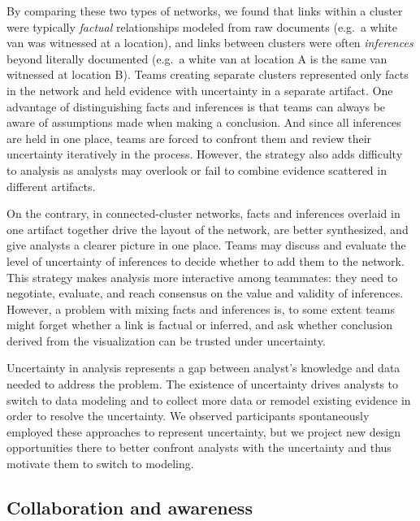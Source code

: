 By comparing these two types of networks, we found that links within a cluster were typically
\emph{factual} relationships modeled from raw documents (e.g.~a white van was
witnessed at a location), and links between clusters were often
\emph{inferences} beyond literally documented (e.g.~a white van at location A
is the same van witnessed at location B). Teams creating separate
clusters represented only facts in the network and held evidence with
uncertainty in a separate artifact. One advantage of distinguishing
facts and inferences is that teams can always be aware of assumptions made when
making a conclusion. And since all inferences are held in one place,
teams are forced to confront them and review their uncertainty
iteratively in the process. However, the strategy also adds difficulty
to analysis as analysts may overlook or fail to combine evidence
scattered in different artifacts.



On the contrary, in connected-cluster networks, facts and inferences overlaid in one artifact together drive the layout of the
network, are better synthesized, and give analysts a clearer picture in one place. Teams may discuss and evaluate the level of uncertainty of inferences to decide whether to add them to the
network. This strategy makes analysis more interactive among teammates:
they need to negotiate, evaluate, and reach consensus on the value and
validity of inferences. However, a problem with mixing facts and inferences is, to some extent teams might forget whether a
link is factual or inferred, and ask whether conclusion derived
from the visualization can be trusted under uncertainty.

Uncertainty in analysis represents a gap between analyst's knowledge and data
needed to address the problem. The existence of uncertainty drives analysts to
switch to data modeling and to collect more data or remodel existing evidence in
order to resolve the uncertainty. We observed participants spontaneously
employed these approaches to represent uncertainty, but we project new design
opportunities there to better confront analysts with the uncertainty and thus
motivate them to switch to modeling.

\subsection{Collaboration and
awareness}\label{collaboration-and-awareness}

